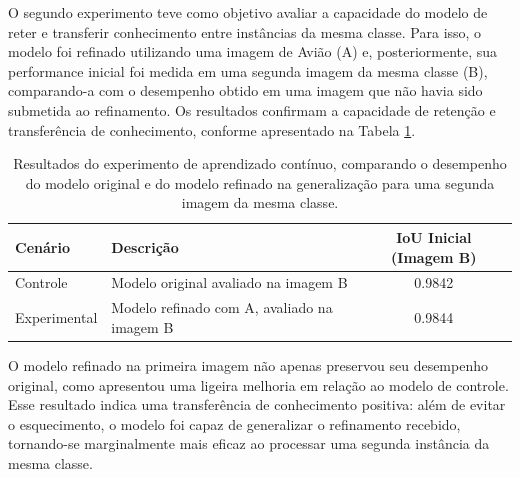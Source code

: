 
O segundo experimento teve como objetivo avaliar a capacidade do modelo de reter e transferir conhecimento entre instâncias da mesma classe. Para isso, o modelo foi refinado utilizando uma imagem de Avião (A) e, posteriormente, sua performance inicial foi medida em uma segunda imagem da mesma classe (B), comparando-a com o desempenho obtido em uma imagem que não havia sido submetida ao refinamento. Os resultados confirmam a capacidade de retenção e transferência de conhecimento, conforme apresentado na Tabela \ref{tab:exp2_results}.



\begin{table}[h!]
\centering
\caption{Resultados do experimento de aprendizado contínuo, comparando o desempenho do modelo original e do modelo refinado na generalização para uma segunda imagem da mesma classe.}
\label{tab:exp2_results}
\begin{tabular}{|l|p{7cm}|c|}
\hline
\textbf{Cenário} & \textbf{Descrição} & \textbf{\ac{IoU} Inicial (Imagem B)} \\ \hline
Controle    & Modelo original avaliado na imagem B & 0.9842 \\ 
Experimental & Modelo refinado com A, avaliado na imagem B & 0.9844 \\ \hline
\end{tabular}
\end{table}


O modelo refinado na primeira imagem não apenas preservou seu desempenho original, como apresentou uma ligeira melhoria em relação ao modelo de controle. Esse resultado indica uma transferência de conhecimento positiva: além de evitar o esquecimento, o modelo foi capaz de generalizar o refinamento recebido, tornando-se marginalmente mais eficaz ao processar uma segunda instância da mesma classe.

